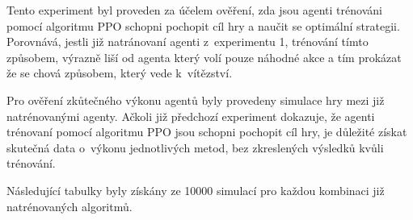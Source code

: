 Tento experiment byl proveden za účelem ověření, zda jsou agenti trénováni pomocí algoritmu PPO schopni pochopit cíl hry a naučit se optimální strategii.
Porovnává, jestli již natránovaní agenti z~experimentu 1, trénování tímto způsobem, výrazně liší od agenta který volí pouze náhodné akce a tím prokázat že se chová způsobem, který vede k~vítězství.

Pro ověření zkůtečného výkonu agentů byly provedeny simulace hry mezi již natrénovanými agenty.
Ačkoli již předchozí experiment dokazuje, že agenti trénovaní pomocí algoritmu PPO jsou schopni pochopit cíl hry, je důležité získat skutečná data o~výkonu jednotlivých metod, bez zkreslených výsledků kvůli trénování.

Následující tabulky byly získány ze 10000 simulací pro každou kombinaci již natrénovaných algoritmů.

